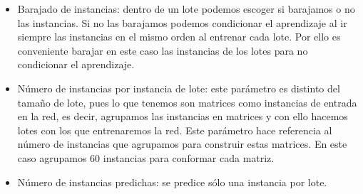 \begin{itemize}
	\item Barajado de instancias: dentro de un lote podemos escoger si barajamos o no las instancias. Si no las barajamos podemos condicionar el aprendizaje al ir siempre las instancias en el mismo orden al entrenar cada lote. Por ello es conveniente barajar en este caso las instancias de los lotes para no condicionar el aprendizaje.
	\item Número de instancias por instancia de lote: este parámetro es distinto del tamaño de lote, pues lo que tenemos son matrices como instancias de entrada en la red, es decir, agrupamos las instancias en matrices y con ello hacemos lotes con los que entrenaremos la red. Este parámetro hace referencia al número de instancias que agrupamos para construir estas matrices. En este caso agrupamos 60 instancias para conformar cada matriz.
	\item Número de instancias predichas: se predice sólo una instancia por lote.
\end{itemize}

